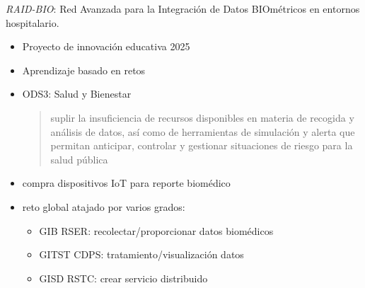 \documentclass[xcolor=table,xcolor=x11names]{beamer}
\begin{document}
\begin{frame}{\subsecname}
    \emph{RAID-BIO}: Red Avanzada para la Integración de Datos BIOmétricos en entornos hospitalario.
    \begin{itemize}
        \item Proyecto de innovación educativa 2025
        \item Aprendizaje basado en retos
        \item ODS3: Salud y Bienestar
            \begin{quote}
                \small
                suplir la insuficiencia de recursos disponibles en materia de recogida y
análisis de datos, así como de herramientas de simulación y alerta que permitan anticipar, controlar y gestionar situaciones
de riesgo para la salud pública
            \end{quote}
        \item compra dispositivos IoT para reporte biomédico
        \item reto global atajado por varios grados:
            \begin{itemize}
                \item GIB RSER: recolectar/proporcionar datos biomédicos
                \item GITST CDPS: tratamiento/visualización datos
                \item GISD RSTC: crear servicio distribuido
            \end{itemize}
    \end{itemize}

\end{frame}
\end{document}
